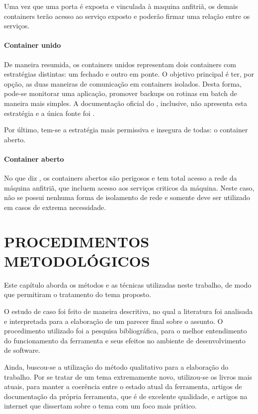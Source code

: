\documentclass[
	12pt,				%
	openright,			%
	oneside,			%
	a4paper,			%
	chapter=TITLE,		%
	section=TITLE,		%
	english,			%
	french,				%
	spanish,			%
	brazil				%
	]{abntex2}
\begin{document}
Uma vez que uma porta é exposta e vinculada à maquina anfitriã, os demais containers terão acesso ao serviço exposto e poderão firmar uma relação entre os serviços.

\subsubsection{Container unido}

De maneira resumida, os containers unidos representam dois containers com estratégias distintas: um fechado e outro em ponte. O objetivo principal é ter, por opção, as duas maneiras de comunicação em containers isolados. Desta forma, pode-se monitorar uma aplicação, promover backups ou rotinas em batch de maneira mais simples. A documentação oficial do , inclusive, não apresenta esta estratégia e a única fonte foi .

Por último, tem-se a estratégia mais permissiva e insegura de todas: o container aberto.

\subsubsection{Container aberto}

No que diz , os containers abertos são perigosos e tem total acesso a rede da máquina anfitriã, que incluem acesso aos serviços criticos da máquina. Neste caso, não se possui nenhuma forma de isolamento de rede e somente deve ser utilizado em casos de extrema necessidade. 

\chapter{PROCEDIMENTOS METODOLÓGICOS}

Este capítulo aborda os métodos e as técnicas utilizadas neste trabalho, de modo que permitiram o tratamento do tema proposto.

O estudo de caso foi feito de maneira descritiva, no qual a literatura foi analisada e interpretada para a elaboração de um parecer final sobre o assunto. O procedimento utilizado foi a pesquisa bibliográfica, para o melhor entendimento do funcionamento da ferramenta e seus efeitos no ambiente de desenvolvimento de software.

Ainda, buscou-se a utilização do método qualitativo para a elaboração do trabalho. Por se tratar de um tema extremamente novo, utilizou-se os livros mais atuais, para manter a coerência entre o estado atual da ferramenta, artigos de documentação da própria ferramenta, que é de excelente qualidade, e artigos na internet que dissertam sobre o tema com um foco mais prático.
\end{document}
